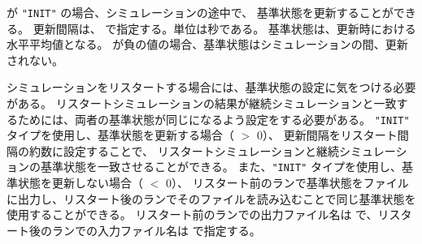  が \verb|"INIT"| の場合、シミュレーションの途中で、
基準状態を更新することができる。
更新間隔は、 で指定する。単位は秒である。
基準状態は、更新時における水平平均値となる。
が負の値の場合、基準状態はシミュレーションの間、更新されない。


シミュレーションをリスタートする場合には、基準状態の設定に気をつける必要がある。
リスタートシミュレーションの結果が継続シミュレーションと一致するためには、両者の基準状態が同じになるよう設定をする必要がある。
%
\verb|"INIT"| タイプを使用し、基準状態を更新する場合（ $>$ 0）、
更新間隔をリスタート間隔の約数に設定することで、
リスタートシミュレーションと継続シミュレーションの基準状態を一致させることができる。
%
また、\verb|"INIT"| タイプを使用し、基準状態を更新しない場合（ $<$ 0）、
リスタート前のランで基準状態をファイルに出力し、リスタート後のランでそのファイルを読み込むことで同じ基準状態を使用することができる。
リスタート前のランでの出力ファイル名は  で、リスタート後のランでの入力ファイル名は  で指定する。
